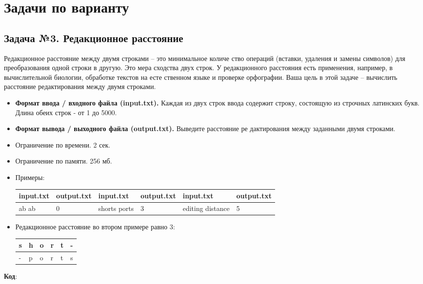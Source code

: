 

\section{Задачи по варианту}
\subsection{Задача №3. Редакционное расстояние}
Редакционное расстояние между двумя строками – это минимальное количе ство операций (вставки, удаления и замены символов) для преобразования одной строки в другую. Это мера сходства двух строк. У редакционного расстояния есть применения, например, в вычислительной биологии, обработке текстов на есте ственном языке и проверке орфографии. Ваша цель в этой задаче – вычислить расстояние редактирования между двумя строками. 
\begin{itemize}
    \item \textbf{Формат ввода / входного файла (input.txt).} Каждая из двух строк ввода содержит строку, состоящую из строчных латинских букв. Длина обеих строк - от 1 до 5000.
	\item \textbf{Формат вывода / выходного файла (output.txt).} Выведите расстояние ре дактирования между заданными двумя строками.
	\item Ограничение по времени. 2 сек.
	\item Ограничение по памяти. 256 мб.
	\item Примеры:

    \begin{tabular}{|p{2cm}|l|p{2cm}|l|p{2cm}|l|}
        \hline
        input.txt & output.txt & input.txt & output.txt & input.txt & output.txt \\ \hline
        ab \newline ab & 0 & shorts \newline ports & 3 & editing \newline distance & 5 \\ \hline
    \end{tabular}
	\item Редакционное расстояние во втором примере равно 3:

    \begin{tabular}{|l|l|l|l|l|l|}
        \hline
        s & h & o & r & t & - \\ \hline
        - & p & o & r & t & s \\ \hline
    \end{tabular}
\end{itemize}
\textbf{Код}:

